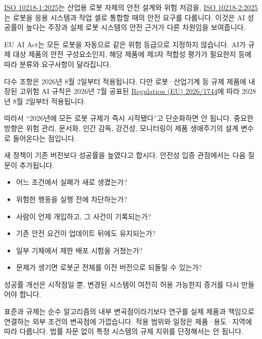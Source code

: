 \documentclass[11pt,openany]{book}
\begin{document}
\href{https://www.iso.org/standard/73933.html}{ISO 10218-1:2025}는 산업용 로봇 자체의 안전 설계와 위험 저감을, \href{https://www.iso.org/standard/73934.html}{ISO 10218-2:2025}는 로봇을 응용 시스템과 작업 셀로 통합할 때의 안전 요구를 다룹니다. 이것은 AI 성공률이 높다는 주장과 실제 로봇 시스템의 안전 근거가 다른 차원임을 보여줍니다.

EU AI Act는 모든 로봇을 자동으로 같은 위험 등급으로 지정하지 않습니다. AI가 규제 대상 제품의 안전 구성요소인지, 해당 제품에 제3자 적합성 평가가 필요한지 등에 따라 분류와 요구사항이 달라집니다.

다수 조항은 2026년 8월 2일부터 적용됩니다. 다만 로봇·산업기계 등 규제 제품에 내장된 고위험 AI 규칙은 2026년 7월 공표된 \href{https://eur-lex.europa.eu/eli/reg/2026/1744/oj}{Regulation (EU) 2026/1744}에 따라 2028년 8월 2일부터 적용됩니다.

따라서 ``2026년에 모든 로봇 규제가 즉시 시작됐다''고 단순화하면 안 됩니다. 중요한 방향은 위험 관리, 문서화, 인간 감독, 강건성, 모니터링이 제품 생애주기의 설계 변수로 들어온다는 점입니다.

\begin{examplebox}
새 정책이 기존 버전보다 성공률을 높였다고 합시다. 안전성 입증 관점에서는 다음 질문이 추가됩니다.

\begin{itemize}
  \item 어느 조건에서 실패가 새로 생겼는가?
  \item 위험한 행동을 실행 전에 차단하는가?
  \item 사람이 언제 개입하고, 그 사건이 기록되는가?
  \item 기존 안전 요건이 업데이트 뒤에도 유지되는가?
  \item 일부 기체에서 제한 배포 시험을 거쳤는가?
  \item 문제가 생기면 로봇군 전체를 이전 버전으로 되돌릴 수 있는가?
\end{itemize}

성공률 개선은 시작점일 뿐, 변경된 시스템이 여전히 허용 가능한지 증거를 다시 만들어야 합니다.
\end{examplebox}

\begin{cautionbox}
표준과 규제는 순수 알고리즘의 내부 변곡점이라기보다 연구를 실제 제품과 책임으로 연결하는 외부 조건의 변곡점에 가깝습니다. 적용 범위와 일정은 제품·용도·지역에 따라 다릅니다. 법률 자문 없이 특정 시스템의 규제 지위를 단정해서는 안 됩니다.
\end{cautionbox}
\end{document}
